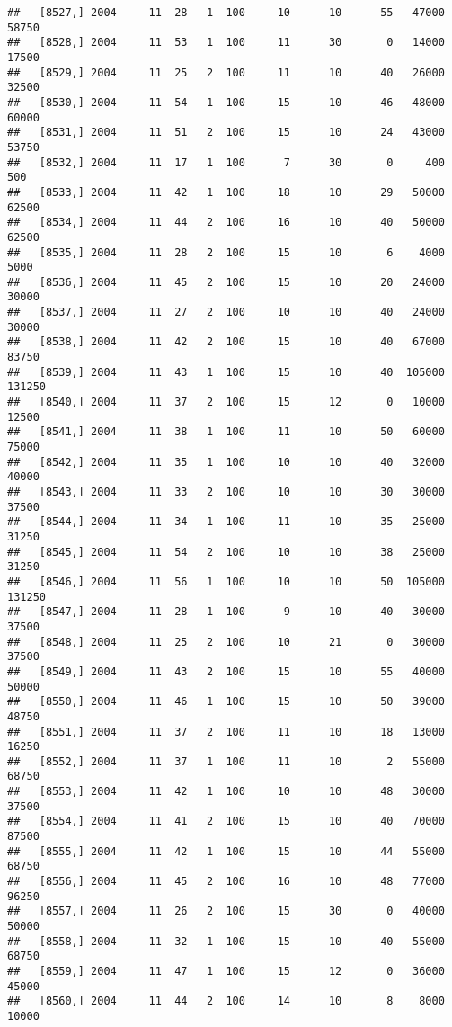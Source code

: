 \documentclass{article}\usepackage[]{graphicx}\usepackage[]{color}
\makeatletter
\newenvironment{kframe}{%
 \def\at@end@of@kframe{}%
 \ifinner\ifhmode%
  \def\at@end@of@kframe{\end{minipage}}%
  \begin{minipage}{\columnwidth}%
 \fi\fi%
 \def\FrameCommand##1{\hskip\@totalleftmargin \hskip-\fboxsep
 \colorbox{shadecolor}{##1}\hskip-\fboxsep
     \hskip-\linewidth \hskip-\@totalleftmargin \hskip\columnwidth}%
 \MakeFramed {\advance\hsize-\width
   \@totalleftmargin\z@ \linewidth\hsize
   \@setminipage}}%
 {\par\unskip\endMakeFramed%
 \at@end@of@kframe}
\newenvironment{knitrout}{}{} %
\makeatother
\begin{document}
\begin{knitrout}
\begin{kframe}
\begin{verbatim}
##   [8527,] 2004     11  28   1  100     10      10      55   47000   58750
##   [8528,] 2004     11  53   1  100     11      30       0   14000   17500
##   [8529,] 2004     11  25   2  100     11      10      40   26000   32500
##   [8530,] 2004     11  54   1  100     15      10      46   48000   60000
##   [8531,] 2004     11  51   2  100     15      10      24   43000   53750
##   [8532,] 2004     11  17   1  100      7      30       0     400     500
##   [8533,] 2004     11  42   1  100     18      10      29   50000   62500
##   [8534,] 2004     11  44   2  100     16      10      40   50000   62500
##   [8535,] 2004     11  28   2  100     15      10       6    4000    5000
##   [8536,] 2004     11  45   2  100     15      10      20   24000   30000
##   [8537,] 2004     11  27   2  100     10      10      40   24000   30000
##   [8538,] 2004     11  42   2  100     15      10      40   67000   83750
##   [8539,] 2004     11  43   1  100     15      10      40  105000  131250
##   [8540,] 2004     11  37   2  100     15      12       0   10000   12500
##   [8541,] 2004     11  38   1  100     11      10      50   60000   75000
##   [8542,] 2004     11  35   1  100     10      10      40   32000   40000
##   [8543,] 2004     11  33   2  100     10      10      30   30000   37500
##   [8544,] 2004     11  34   1  100     11      10      35   25000   31250
##   [8545,] 2004     11  54   2  100     10      10      38   25000   31250
##   [8546,] 2004     11  56   1  100     10      10      50  105000  131250
##   [8547,] 2004     11  28   1  100      9      10      40   30000   37500
##   [8548,] 2004     11  25   2  100     10      21       0   30000   37500
##   [8549,] 2004     11  43   2  100     15      10      55   40000   50000
##   [8550,] 2004     11  46   1  100     15      10      50   39000   48750
##   [8551,] 2004     11  37   2  100     11      10      18   13000   16250
##   [8552,] 2004     11  37   1  100     11      10       2   55000   68750
##   [8553,] 2004     11  42   1  100     10      10      48   30000   37500
##   [8554,] 2004     11  41   2  100     15      10      40   70000   87500
##   [8555,] 2004     11  42   1  100     15      10      44   55000   68750
##   [8556,] 2004     11  45   2  100     16      10      48   77000   96250
##   [8557,] 2004     11  26   2  100     15      30       0   40000   50000
##   [8558,] 2004     11  32   1  100     15      10      40   55000   68750
##   [8559,] 2004     11  47   1  100     15      12       0   36000   45000
##   [8560,] 2004     11  44   2  100     14      10       8    8000   10000

\end{verbatim}
\end{kframe}
\end{knitrout}
\end{document}
